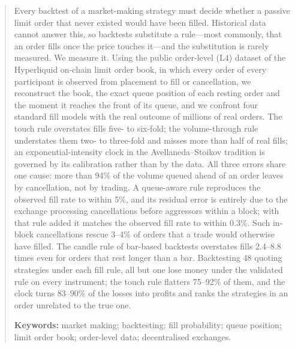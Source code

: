 \begin{abstract}
\noindent
Every backtest of a market-making strategy must decide whether a passive limit
order that never existed would have been filled. Historical data cannot answer
this, so backtests substitute a rule---most commonly, that an order fills once
the price touches it---and the substitution is rarely measured. We measure it.
Using the public order-level (L4) dataset of the Hyperliquid on-chain limit order
book, in which every order of every participant is observed from placement to
fill or cancellation, we reconstruct the book, the exact queue position of each
resting order and the moment it reaches the front of its queue, and we confront
four standard fill models with the real outcome of millions of real orders.
The touch rule overstates fills five- to six-fold; the volume-through rule
understates them two- to three-fold and misses more than half of real fills;
an exponential-intensity clock in the Avellaneda--Stoikov tradition is governed
by its calibration rather than by the data. All three errors share one cause:
more than 94\% of the volume queued ahead of an order leaves by cancellation, not
by trading. A queue-aware rule reproduces the observed fill rate to within 5\%,
and its residual error is entirely due to the exchange processing cancellations
before aggressors within a block; with that rule added it matches the observed
fill rate to within 0.3\%. Such in-block cancellations rescue 3--4\% of orders that a
trade would otherwise have filled. The candle rule of bar-based backtests
overstates fills 2.4--8.8 times even for orders that rest longer than a bar. Backtesting 48 quoting strategies under each
fill rule, all but one lose money under the validated rule on every instrument;
the touch rule flatters 75--92\% of them, and the clock turns 83--90\% of the
losses into profits and ranks the strategies in an order unrelated to the true
one.

\medskip
\noindent\textbf{Keywords:} market making; backtesting; fill probability; queue
position; limit order book; order-level data; decentralised exchanges.
\end{abstract}
